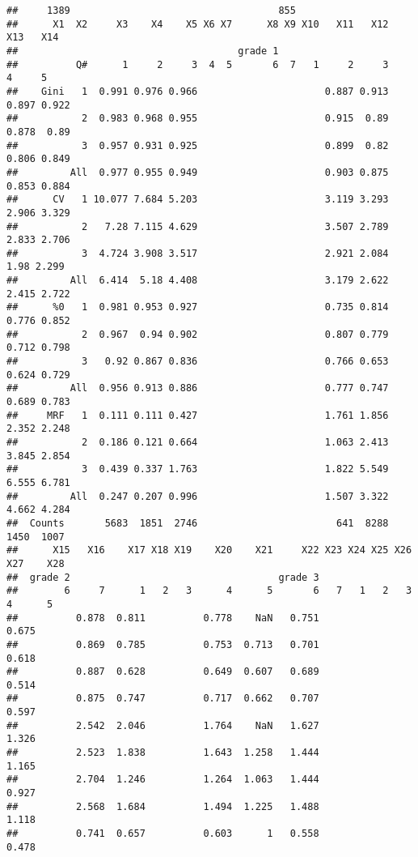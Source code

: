 \documentclass[
]{article}
\begin{document}
\begin{verbatim}
##     1389                                    855
##      X1  X2     X3    X4    X5 X6 X7      X8 X9 X10   X11   X12   X13   X14
##                                      grade 1                               
##          Q#      1     2     3  4  5       6  7   1     2     3     4     5
##    Gini   1  0.991 0.976 0.966                      0.887 0.913 0.897 0.922
##           2  0.983 0.968 0.955                      0.915  0.89 0.878  0.89
##           3  0.957 0.931 0.925                      0.899  0.82 0.806 0.849
##         All  0.977 0.955 0.949                      0.903 0.875 0.853 0.884
##      CV   1 10.077 7.684 5.203                      3.119 3.293 2.906 3.329
##           2   7.28 7.115 4.629                      3.507 2.789 2.833 2.706
##           3  4.724 3.908 3.517                      2.921 2.084  1.98 2.299
##         All  6.414  5.18 4.408                      3.179 2.622 2.415 2.722
##      %0   1  0.981 0.953 0.927                      0.735 0.814 0.776 0.852
##           2  0.967  0.94 0.902                      0.807 0.779 0.712 0.798
##           3   0.92 0.867 0.836                      0.766 0.653 0.624 0.729
##         All  0.956 0.913 0.886                      0.777 0.747 0.689 0.783
##     MRF   1  0.111 0.111 0.427                      1.761 1.856 2.352 2.248
##           2  0.186 0.121 0.664                      1.063 2.413 3.845 2.854
##           3  0.439 0.337 1.763                      1.822 5.549 6.555 6.781
##         All  0.247 0.207 0.996                      1.507 3.322 4.662 4.284
##  Counts       5683  1851  2746                        641  8288  1450  1007
##      X15   X16    X17 X18 X19    X20    X21     X22 X23 X24 X25 X26 X27    X28
##  grade 2                                    grade 3                           
##        6     7      1   2   3      4      5       6   7   1   2   3   4      5
##          0.878  0.811          0.778    NaN   0.751                      0.675
##          0.869  0.785          0.753  0.713   0.701                      0.618
##          0.887  0.628          0.649  0.607   0.689                      0.514
##          0.875  0.747          0.717  0.662   0.707                      0.597
##          2.542  2.046          1.764    NaN   1.627                      1.326
##          2.523  1.838          1.643  1.258   1.444                      1.165
##          2.704  1.246          1.264  1.063   1.444                      0.927
##          2.568  1.684          1.494  1.225   1.488                      1.118
##          0.741  0.657          0.603      1   0.558                      0.478

\end{verbatim}
\end{document}
